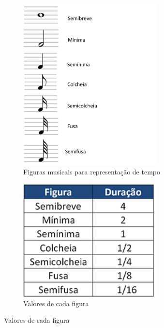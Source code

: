 \documentclass[12pt]{report}
\begin{document}
\begin{figure}[H]
  \centering
  \begin{subfigure}{0.4\textwidth}
    \centering
    \includegraphics[width=0.8\textwidth]{imagens/tempos.png}
    \caption{Figuras musicais para representação de tempo}
    \label{fig:tempos}
  \end{subfigure}
  \begin{subfigure}{0.4\textwidth}
    \centering
    \includegraphics[width=0.8\textwidth]{imagens/semibreve.png}
    \caption{Valores de cada figura}
    \label{fig:tempos_valores}
  \end{subfigure}
\end{figure}
\end{document}
